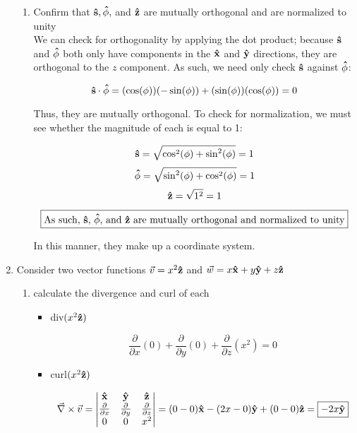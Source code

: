 \begin{enumerate}
\begin{enumerate}
          \item Confirm that $\bold{\hat{s}}, \bold{\hat{\phi}},$ and $\bold{\hat{z}}$ are mutually orthogonal and are normalized to unity\\

            We can check for orthogonality by applying the dot product; because $\bold{\hat{s}}$ and $\bold{\hat{\phi}}$ both only have components in the $\bold{\hat{x}}$ and $\bold{\hat{y}}$ directions, they are orthogonal to the $z$ component. As such, we need only check $\bold{\hat{s}}$ against $\bold{\hat{\phi}}$:

            $$\bold{\hat{s}}\cdot\bold{\hat{\phi}}=(\cos(\phi))(-\sin(\phi))+(\sin(\phi))(\cos(\phi))=0$$

            Thus, they are mutually orthogonal. To check for normalization, we must see whether the magnitude of each is equal to 1:

            $$\bold{\hat{s}}=\sqrt{\cos^2(\phi)+\sin^2(\phi)}=1$$
            $$\bold{\hat{\phi}}=\sqrt{\sin^2(\phi)+\cos^2(\phi)}=1$$
            $$\bold{\hat{z}}=\sqrt{1^2}=1$$

            $$\boxed{\text{As such, $\bold{\hat{s}}$, $\bold{\hat{\phi}}$, and $\bold{\hat{z}}$ are mutually orthogonal and normalized to unity}}$$

            In this manner, they make up a coordinate system.

    \end{enumerate}

  \item Consider two vector functions $\vec{v}=x^2\bold{\hat{z}}$ and $\vec{w}=x\bold{\hat{x}}+y\bold{\hat{y}}+z\bold{\hat{z}}$

    \begin{enumerate}

      \item calculate the divergence and curl of each

        \begin{itemize}

          \item div$(x^2\bold{\hat{z}})$

            $$\boxed{\frac{\partial}{\partial x}(0)+\frac{\partial}{\partial y}(0)+\frac{\partial}{\partial z}(x^2)=0}$$

          \item curl$(x^2\bold{\hat{z}})$

            $$\vec{\nabla}\times\vec{v}=\left|\begin{matrix}\bold{\hat{x}} & \bold{\hat{y}} & \bold{\hat{z}}\\ \frac{\partial}{\partial x} & \frac{\partial}{\partial y} & \frac{\partial}{\partial z}\\ 0 & 0 & x^2\end{matrix}\right|=(0-0)\bold{\hat{x}}-(2x-0)\bold{\hat{y}}+(0-0)\bold{\hat{z}}=\boxed{-2x\bold{\hat{y}}}$$


\end{itemize}
\end{enumerate}
\end{enumerate}
